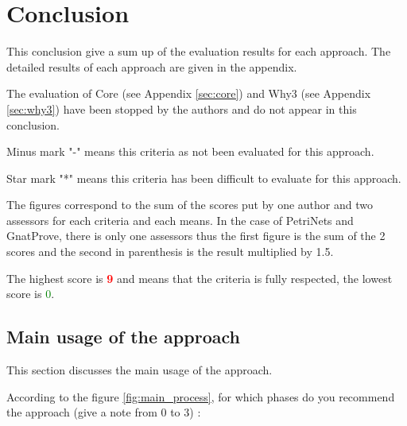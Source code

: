 

\chapter{Conclusion}
\label{sec:concl}

This conclusion give a sum up of the evaluation results for each approach. The detailed results of each approach are given in the appendix.

The evaluation of Core (see Appendix \ref{sec:core}) and Why3 (see Appendix \ref{sec:why3}) have been stopped by the authors and do not appear in this conclusion.

Minus mark "-" means this criteria as not been evaluated for this approach.

Star mark "*" means this criteria has been difficult to evaluate for this approach.

The figures correspond to the sum of the scores put by one author and two assessors for each criteria and each means.
In the case of PetriNets and GnatProve, there is only one assessors thus the first figure is the sum of the 2 scores and the second in parenthesis is the result multiplied by 1.5.

The highest score is \textcolor{red}{\textbf{9}} and means that the criteria is fully respected, the lowest score is \textcolor{green}{0}.

\section{Main usage of the approach}
\label{main_usage}
This section discusses the main usage of the approach.

According to the figure \ref{fig:main_process}, for which phases do you recommend the approach (give a note from 0 to  3) :

